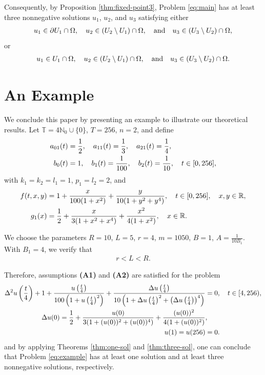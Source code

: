 \documentclass[reqno, 12pt]{amsart}
\numberwithin{equation}{section}
\begin{document}
\vspace{0.1 in}

\noindent Consequently, by Proposition \ref{thm:fixed-point3}, Problem \eqref{eq:main} has at least three nonnegative solutions $u_1$, $u_2$, and $u_3$ satisfying either
\begin{align}
u_1 \in \partial U_1 \cap \Omega, \quad u_2 \in (U_2 \setminus U_1) \cap \Omega, \quad \text{and} \quad u_3 \in (U_3 \setminus U_2) \cap \Omega, \notag
\end{align}
or
\begin{align}
u_1 \in U_1 \cap \Omega, \quad u_2 \in (U_2 \setminus U_1) \cap \Omega, \quad \text{and} \quad u_3 \in (U_3 \setminus U_2) \cap \Omega. \notag
\end{align}

\section{An Example}
\label{example}

We conclude this paper by presenting an example to illustrate our theoretical results. Let $\mathbb{T} = 4\mathbb{N}_0 \cup \{0\}$, $T = 256$, $n = 2$, and define
\begin{align}
a_{01}(t) &= \frac{1}{2}, \quad a_{11}(t) = \frac{1}{3}, \quad a_{21}(t) = \frac{1}{4}, \notag\\
b_0(t) &= 1, \quad b_1(t) = \frac{1}{100}, \quad b_2(t) = \frac{1}{10}, \quad t \in [0, 256], \notag
\end{align}
with $k_1 = k_2 = l_1 = 1$, $p_1 = l_2 = 2$, and
\begin{align}
f(t, x, y) &= 1 + \frac{x}{100(1 + x^2)} + \frac{y}{10(1 + y^2 + y^4)}, \quad t \in [0, 256], \quad x, y \in \mathbb{R}, \notag\\
g_1(x) &= \frac{1}{2} + \frac{x}{3(1 + x^2 + x^4)} + \frac{x^2}{4(1 + x^2)}, \quad x \in \mathbb{R}. \notag
\end{align}

We choose the parameters $R = 10$, $L = 5$, $r = 4$, $m = 1050$, $B = 1$, $A = \frac{1}{10B_1}$. With $B_1 = 4$, we verify that
\begin{align}
r<L<R.
\end{align}

Therefore, assumptions {\bf (A1)} and  {\bf (A2)} are satisfied for the problem
\begin{align}
\label{eq:example}
\Delta^2 u\left(\frac{t}{4}\right) + 1 + \frac{u\left(\frac{t}{4}\right)}{100\left(1 + u\left(\frac{t}{4}\right)^2\right)} + \frac{\Delta u\left(\frac{t}{4}\right)}{10\left(1 + \Delta u\left(\frac{t}{4}\right)^2 + \left(\Delta u\left(\frac{t}{4}\right)\right)^4\right)} &= 0, \quad t \in [4, 256), \notag\\
\Delta u(0) = \frac{1}{2} + \frac{u(0)}{3(1 + (u(0))^2 + (u(0))^4)} + \frac{(u(0))^2}{4(1 + (u(0))^2)}&, \notag\\
u(1) = u(256) &= 0. 
\end{align}
and by applying Theorems \ref{thm:one-sol} and \ref{thm:three-sol}, one can conclude that Problem \eqref{eq:example} has at least one solution and at least three nonnegative solutions, respectively.
\end{document}
